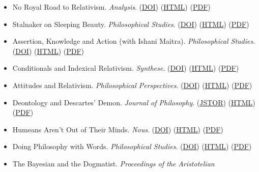 \documentclass[
  10pt,
  letterpaper,
  DIV=11,
  numbers=noendperiod,
  twoside]{scrartcl}
\begin{document}
\begin{itemize}
\item
  No Royal Road to Relativism. \emph{Analysis}.
  (\href{http://dx.doi.org/10.1093/analys/anq060}{DOI})
  (\href{./posts/nrrtr/no-royal-road-to-relativism.html}{HTML})
  (\href{./posts/nrrtr/No\%20Royal\%20Road\%20to\%20Relativism.pdf}{PDF})
\item
  Stalnaker on Sleeping Beauty. \emph{Philosophical Studies}.
  (\href{http://dx.doi.org/10.1007/s11098-010-9613-1}{DOI})
  (\href{./posts/stalnaker-sleeping-beauity/stalnaker-on-sleeping-beauty.html}{HTML})
  (\href{./posts/stalnaker-sleeping-beauty/Stalnaker\%20on\%20Sleeping\%20Beauty.pdf}{PDF})
\item
  Assertion, Knowledge and Action (with Ishani Maitra).
  \emph{Philosophical Studies}.
  (\href{http://dx.doi.org/10.1007/s11098-010-9542-z}{DOI})
  (\href{./posts/aka/assertion-knowledge-and-action.html}{HTML})
  (\href{./posts/aka/Assertion,\%20Knowledge\%20and\%20Action.pdf}{PDF})
\item
  Conditionals and Indexical Relativism. \emph{Synthese}.
  (\href{http://dx.doi.org/10.1007/s11229-007-9283-5}{DOI})
  (\href{./posts/cair/conditionals-and-indexical-relativism.html}{HTML})
  (\href{./posts/cair/Conditionals\%20and\%20Indexical\%20Relativism.pdf}{PDF})
\item
  Attitudes and Relativism. \emph{Philosophical Perspectives}.
  (\href{http://dx.doi.org/10.1111/j.1520-8583.2008.00156.x}{DOI})
  (\href{./posts/relative-attitude/attitudes-and-relativism.html}{HTML})
  (\href{./posts/relative-attitude/Attitudes\%20and\%20Relativism.pdf}{PDF})
\item
  Deontology and Descartes' Demon. \emph{Journal of Philosophy}.
  (\href{https://www.jstor.org/stable/20620125}{JSTOR})
  (\href{./posts/ddd/deontology-and-descartess-demon.html}{HTML})
  (\href{./posts/ddd/Deontology\%20and\%20Descartes's\%20Demon.pdf}{PDF})
\item
  Humeans Aren't Out of Their Minds. \emph{Nous}.
  (\href{http://dx.doi.org/10.1111/j.1468-0068.2007.00659.x}{DOI})
  (\href{./posts/haootm/humeans-arent-out-of-their-minds.html}{HTML})
  (\href{./posts/haootm/Humeans\%20Aren't\%20Out\%20of\%20Their\%20Minds.pdf}{PDF})
\item
  Doing Philosophy with Words. \emph{Philosophical Studies}.
  (\href{http://dx.doi.org/10.1007/s11098-006-9026-3}{DOI})
  (\href{./posts/dpww/doing-philosophy-with-words.html}{HTML})
  (\href{./posts/dpww/Doing\%20Philosophy\%20With\%20Words.pdf}{PDF})
\item
  The Bayesian and the Dogmatist. \emph{Proceedings of the Aristotelian
}
\end{itemize}
\end{document}

